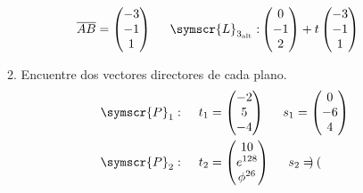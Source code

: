 \documentclass{article}
\def\fancyL{\symscr{L}}
\def\fancyP{\symscr{P}}
\begin{document}
\begin{enumerate}
\begin{enumerate}[label=\listAlph]
\[\begin{aligned}
                    \overline{AB} = 
                    \begin{pmatrix}
                        -3 \\ -1 \\ 1
                    \end{pmatrix}
                    \hspace{0.5cm}
                    \fancyL_{3_{\text{alt}}}:&
                    \begin{pmatrix}
                        0 \\ -1 \\ 2 
                    \end{pmatrix}
                    +
                    t\begin{pmatrix}
                        -3 \\ -1 \\ 1
                    \end{pmatrix}
                \end{aligned}
            \]
		\item Encuentre dos vectores directores de cada plano.
            \[
                \begin{aligned}
                    \fancyP_1:&
                    \hspace{0.5cm}
                    t_1 = \begin{pmatrix}
                        -2 \\ 5 \\ -4
                    \end{pmatrix}
                    \hspace{0.5cm}
                    s_1 = \begin{pmatrix}   
                        0 \\ -6 \\ 4
                    \end{pmatrix}
                    \\
                    \fancyP_2:&
                    \hspace{0.5cm}
                    t_2 = \begin{pmatrix}
                        10 \\ e^{128} \\ \phi^{26}
                    \end{pmatrix}
                    \hspace{0.5cm}
                    s_2 = \begin{pmatrix}

\end{pmatrix}
\end{aligned}\]
\end{enumerate}
\end{enumerate}
\end{document}

